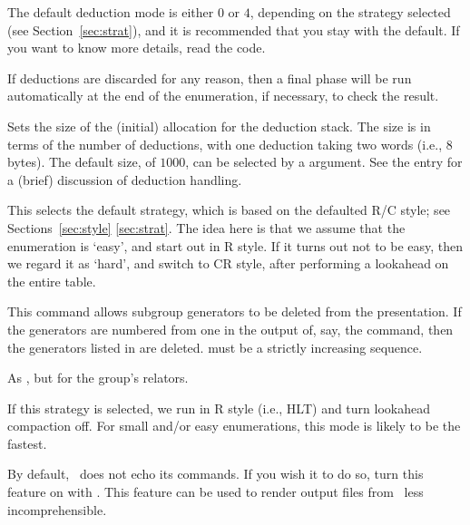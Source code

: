 The default deduction mode is either $0$ or $4$, depending on the strategy
  selected (see Section~\ref{sec:strat}), and it is recommended that you
  stay with the default.
If you want to know more details, read the code.

If deductions are discarded for any reason, then a final  phase
  will be run automatically at the end of the enumeration, if necessary, to
  check the result.

\quad{}

Sets the size of the (initial) allocation for the deduction stack.
The size is in terms of the number of deductions, with one deduction
  taking two words (i.e., 8 bytes).
The default size, of $1000$, can be selected by a  argument.
See the  entry for a (brief) discussion of deduction handling.

\quad{}

This selects the default strategy, which is based on the defaulted
  R/C style; see Sections~\ref{sec:style} \amp \ref{sec:strat}.
The idea here is that we assume that the enumeration is `easy'\kern-1.5pt,
  and start out in R style.
If it turns out not to be easy, then we regard it as `hard'\kern-1.5pt,
  and switch to CR style, after performing a lookahead on the entire
  table.

\quad{}

This command allows subgroup generators to be deleted from the
  presentation.
If the generators are numbered from one in the output of, say, the
   command, then the generators listed in  are
  deleted.
 must be a strictly increasing sequence.

\quad{}

As , but for the group's relators.

\quad{}

If this strategy is selected, we run in R style (i.e., HLT) and turn
  lookahead \amp compaction off.
For small and/or easy enumerations, this mode is likely to be the fastest.

\quad{}

By default, \ace\ does not echo its commands.
If you wish it to do so, turn this feature on with .
This feature can be used to render output files from \ace\ less
  incomprehensible.


